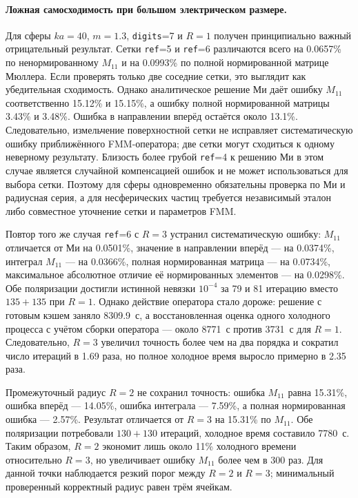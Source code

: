 \documentclass[12pt,a4paper]{article}
\begin{document}
\paragraph{Ложная самосходимость при большом электрическом размере.}
Для сферы $ka=40$, $m=1.3$, \texttt{digits}=7 и $R=1$ получен принципиально
важный отрицательный результат. Сетки \texttt{ref}=5 и \texttt{ref}=6
различаются всего на 0.0657\% по ненормированному $M_{11}$ и на 0.0993\% по
полной нормированной матрице Мюллера. Если проверять только две соседние сетки,
это выглядит как убедительная сходимость. Однако аналитическое решение Ми даёт
ошибку $M_{11}$ соответственно 15.12\% и 15.15\%, а ошибку полной
нормированной матрицы 3.43\% и 3.48\%. Ошибка в направлении вперёд остаётся
около 13.1\%. Следовательно, измельчение поверхностной сетки не исправляет
систематическую ошибку приближённого FMM-оператора; две сетки могут сходиться к
одному неверному результату. Близость более грубой \texttt{ref}=4 к решению Ми
в этом случае является случайной компенсацией ошибок и не может использоваться
для выбора сетки. Поэтому для сферы одновременно обязательны проверка по Ми и
радиусная серия, а для несферических частиц требуется независимый эталон либо
совместное уточнение сетки и параметров FMM.

Повтор того же случая \texttt{ref}=6 с $R=3$ устранил систематическую ошибку:
$M_{11}$ отличается от Ми на 0.0501\%, значение в направлении вперёд --- на
0.0374\%, интеграл $M_{11}$ --- на 0.0366\%, полная нормированная матрица ---
на 0.0734\%, максимальное абсолютное отличие её нормированных элементов ---
на 0.0298\%. Обе поляризации достигли истинной невязки $10^{-4}$ за 79 и 81
итерацию вместо $135+135$ при $R=1$. Однако действие оператора стало дороже:
решение с готовым кэшем заняло 8309.9~с, а восстановленная оценка одного
холодного процесса с учётом сборки оператора --- около 8771~с против 3731~с
для $R=1$. Следовательно, $R=3$ увеличил точность более чем на два порядка и
сократил число итераций в 1.69 раза, но полное холодное время выросло примерно
в 2.35 раза.

Промежуточный радиус $R=2$ не сохранил точность: ошибка $M_{11}$ равна
15.31\%, ошибка вперёд --- 14.05\%, ошибка интеграла --- 7.59\%, а полная
нормированная ошибка --- 2.57\%. Результат отличается от $R=3$ на 15.31\% по
$M_{11}$. Обе поляризации потребовали $130+130$ итераций, холодное время
составило 7780~с. Таким образом, $R=2$ экономит лишь около 11\% холодного
времени относительно $R=3$, но увеличивает ошибку $M_{11}$ более чем в 300
раз. Для данной точки наблюдается резкий порог между $R=2$ и $R=3$;
минимальный проверенный корректный радиус равен трём ячейкам.
\end{document}
